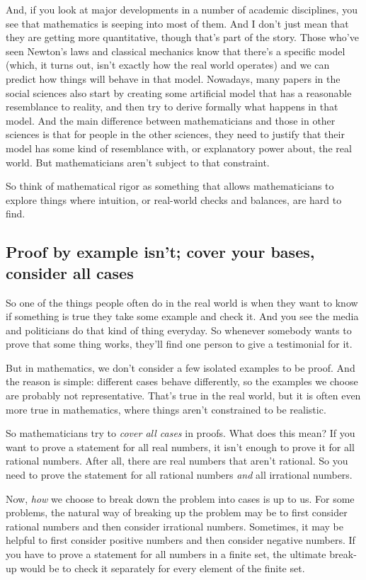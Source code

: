 \documentclass{amsart}
\begin{document}
And, if you look at major developments in a number of academic
disciplines, you see that mathematics is seeping into most of
them. And I don't just mean that they are getting more quantitative,
though that's part of the story. Those who've seen Newton's laws and
classical mechanics know that there's a specific model (which, it
turns out, isn't exactly how the real world operates) and we can
predict how things will behave in that model. Nowadays, many papers in
the social sciences also start by creating some artificial model that
has a reasonable resemblance to reality, and then try to derive
formally what happens in that model. And the main difference between
mathematicians and those in other sciences is that for people in the
other sciences, they need to justify that their model has some kind of
resemblance with, or explanatory power about, the real world. But
mathematicians aren't subject to that constraint.

So think of mathematical rigor as something that allows mathematicians
to explore things where intuition, or real-world checks and balances,
are hard to find.

\subsection{Proof by example isn't; cover your bases, consider all cases}

So one of the things people often do in the real world is when they
want to know if something is true they take some example and check
it. And you see the media and politicians do that kind of thing
everyday. So whenever somebody wants to prove that some thing works,
they'll find one person to give a testimonial for it.

But in mathematics, we don't consider a few isolated examples to be
proof. And the reason is simple: different cases behave differently,
so the examples we choose are probably not representative. That's true
in the real world, but it is often even more true in mathematics,
where things aren't constrained to be realistic.

So mathematicians try to {\em cover all cases} in proofs. What does
this mean? If you want to prove a statement for all real numbers, it
isn't enough to prove it for all rational numbers. After all, there
are real numbers that aren't rational. So you need to prove the
statement for all rational numbers {\em and} all irrational numbers.

Now, {\em how} we choose to break down the problem into cases is up to
us. For some problems, the natural way of breaking up the problem may
be to first consider rational numbers and then consider irrational
numbers. Sometimes, it may be helpful to first consider positive
numbers and then consider negative numbers. If you have to prove a
statement for all numbers in a finite set, the ultimate break-up would
be to check it separately for every element of the finite set.
\end{document}
